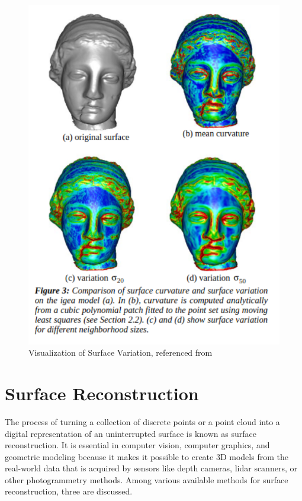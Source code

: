 \begin{figure}[htbp]
    \centering
    \includegraphics[width=0.6\linewidth]{97_graphics/related_work/surf_variation_with_description.pdf}
    \caption{Visualization of Surface Variation, referenced from \parencite{pauly2002efficient}}
    \label{fig:related_work-surface_variation_visualize}
\end{figure}

\section{Surface Reconstruction}
The process of turning a collection of discrete points or a point cloud into a digital representation of an uninterrupted surface is known as surface reconstruction. It is essential in computer vision, computer graphics, and geometric modeling because it makes it possible to create 3D models from the real-world data that is acquired by sensors like depth cameras, lidar scanners, or other photogrammetry methods. Among various available methods for surface reconstruction, three are discussed.

